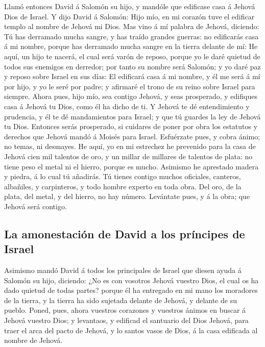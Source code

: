  Llamó entonces David á Salomón su hijo, y mandóle que
edificase casa á Jehová Dios de Israel.  Y dijo David á
Salomón: Hijo mío, en mi corazón tuve el edificar templo al nombre de
Jehová mi Dios.  Mas vino á mí palabra de Jehová,
diciendo: Tú has derramado mucha sangre, y has traído grandes guerras:
no edificarás casa á mi nombre, porque has derramado mucha sangre en la
tierra delante de mí:  He aquí, un hijo te nacerá, el cual
será varón de reposo, porque yo le daré quietud de todos sus enemigos en
derredor; por tanto su nombre será Salomón; y yo daré paz y reposo sobre
Israel en sus días:  El edificará casa á mi nombre, y él
me será á mí por hijo, y yo le seré por padre; y afirmaré el trono de su
reino sobre Israel para siempre.  Ahora pues, hijo mío,
sea contigo Jehová, y seas prosperado, y edifiques casa á Jehová tu
Dios, como él ha dicho de ti.  Y Jehová te dé
entendimiento y prudencia, y él te dé mandamientos para Israel; y que tú
guardes la ley de Jehová tu Dios.  Entonces serás
prosperado, si cuidares de poner por obra los estatutos y derechos que
Jehová mandó á Moisés para Israel. Esfuérzate pues, y cobra ánimo; no
temas, ni desmayes.  He aquí, yo en mi estrechez he
prevenido para la casa de Jehová cien mil talentos de oro, y un millar
de millares de talentos de plata: no tiene peso el metal ni el hierro,
porque es mucho. Asimismo he aprestado madera y piedra, á lo cual tú
añadirás.  Tú tienes contigo muchos oficiales, canteros,
albañiles, y carpinteros, y todo hombre experto en toda obra.
 Del oro, de la plata, del metal, y del hierro, no hay
número. Levántate pues, y á la obra; que Jehová será contigo.

\hypertarget{la-amonestaciuxf3n-de-david-a-los-pruxedncipes-de-israel}{%
\subsection{La amonestación de David a los príncipes de
Israel}\label{la-amonestaciuxf3n-de-david-a-los-pruxedncipes-de-israel}}

 Asimismo mandó David á todos los principales de Israel
que diesen ayuda á Salomón su hijo, diciendo:  ¿No es con
vosotros Jehová vuestro Dios, el cual os ha dado quietud de todas
partes? porque él ha entregado en mi mano los moradores de la tierra, y
la tierra ha sido sujetada delante de Jehová, y delante de su pueblo.
 Poned, pues, ahora vuestros corazones y vuestros ánimos
en buscar á Jehová vuestro Dios; y levantaos, y edificad el santuario
del Dios Jehová, para traer el arca del pacto de Jehová, y lo santos
vasos de Dios, á la casa edificada al nombre de Jehová.

